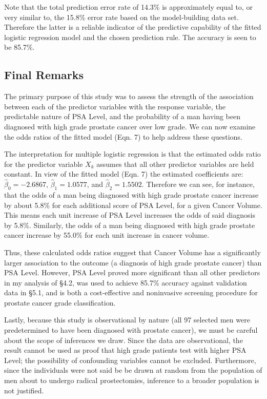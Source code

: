 Note that the total prediction error rate of 14.3\% is approximately equal to, or very similar to, the 15.8\% error rate based on the model-building data set. Therefore the latter is a reliable indicator of the predictive capability of the fitted logistic regression model and the chosen prediction rule. The accuracy is seen to be 85.7\%.

\subsection{Final Remarks}
The primary purpose of this study was to assess the strength of the association between each of the predictor variables with the response variable, the predictable nature of PSA Level, and the probability of a man having been diagnosed with high grade prostate cancer over low grade. We can now examine the odds ratios of the fitted model (Eqn. 7) to help address these questions. \par
The interpretation for multiple logistic regression is that the estimated odds ratio for the predictor variable \(X_k\) assumes that all other predictor variables are held constant. In view of the fitted model (Eqn. 7) the estimated coefficients are: \(\hat{\beta}_0 = -2.6867\), \(\hat{\beta}_1 = 1.0577\), and \(\hat{\beta}_2 = 1.5502\).
Therefore we can see, for instance, that the odds of a man being diagnosed with high grade prostate cancer increase by about 5.8\% for each additional score of PSA Level, for a given Cancer Volume. This means each unit increase of PSA Level increases the odds of said diagnosis by 5.8\%. Similarly, the odds of a man being diagnosed with high grade prostate cancer increase by  55.0\% for each unit increase in cancer volume. \par 
Thus, these calculated odds ratios suggest that Cancer Volume has a significantly larger association to the outcome (a diagnosis of high grade prostate cancer) than PSA Level. However, PSA Level proved more significant than all other predictors in my analysis of \S4.2, was used to achieve 85.7\% accuracy against validation data in \S5.1, and is both a cost-effective and noninvasive screening procedure for prostate cancer grade classification. \par
Lastly, because this study is observational by nature (all 97 selected men were predetermined to have been diagnosed with prostate cancer), we must be careful about the scope of inferences we draw. Since the data are observational, the result cannot be used as proof that high grade patients test with higher PSA Level; the possibility of confounding variables cannot be excluded. Furthermore, since the individuals were not said be be drawn at random from the population of men about to undergo radical prostectomies, inference to a broader population is not justified.
